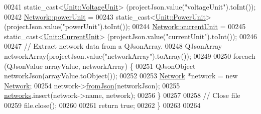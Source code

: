 \begin{DoxyCode}
00241     \textcolor{keyword}{static\_cast<}\hyperlink{class_unit_a55b07dfa9457e1eca2c7194fe0cfc3c1}{Unit::VoltageUnit}\textcolor{keyword}{>} (projectJson.value(\textcolor{stringliteral}{"voltageUnit"}).toInt());
00242   \hyperlink{group___models_ga9504015bc566f4a3d3b4d4a86000293b}{Network::powerUnit} =
00243     \textcolor{keyword}{static\_cast<}\hyperlink{class_unit_ace265ae255370ccacfd5370337572c3b}{Unit::PowerUnit}\textcolor{keyword}{>} (projectJson.value(\textcolor{stringliteral}{"powerUnit"}).toInt());
00244   \hyperlink{group___models_gac6a26db5fef2b1dd2a00faf6340d1702}{Network::currentUnit} =
00245     \textcolor{keyword}{static\_cast<}\hyperlink{class_unit_a0794cf6c9682f48296dd4a5315389787}{Unit::CurrentUnit}\textcolor{keyword}{>} (projectJson.value(\textcolor{stringliteral}{"currentUnit"}).toInt());
00246 
00247   \textcolor{comment}{// Extract network data from a QJsonArray.}
00248   QJsonArray networkArray(projectJson.value(\textcolor{stringliteral}{"networkArray"}).toArray());
00249 
00250   \textcolor{keywordflow}{foreach} (QJsonValue arrayValue, networkArray) \{
00251     QJsonObject networkJson(arrayValue.toObject());
00252 
00253     \hyperlink{class_network}{Network} *network = \textcolor{keyword}{new} \hyperlink{class_network}{Network};
00254     network->\hyperlink{group___models_ga2aef0f6c0d9569ec4d6b948d1ef0d5f1}{fromJson}(networkJson);
00255     \hyperlink{class_project_aa98126154cab59769a431668e6f17daf}{networks}.insert(network->name, network);
00256   \}
00257 
00258 \textcolor{comment}{// Close file}
00259   file.close();
00260 
00261   \textcolor{keywordflow}{return} \textcolor{keyword}{true};
00262 \}
00263 
00264 
\end{DoxyCode}
